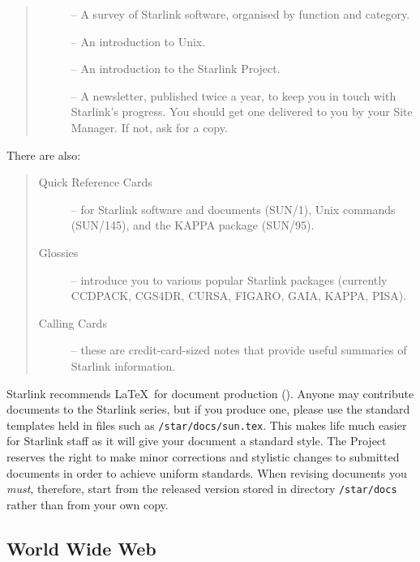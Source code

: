 \newpage

\begin{quote}
\begin{description}
\item []
-- A survey of Starlink software, organised by function and category.
\item []
-- An introduction to Unix.
\item []
-- An introduction to the Starlink Project.
\item [] 
-- A newsletter, published twice a year, to keep you in touch with Starlink's
progress.
You should get one delivered to you by your Site Manager.
If not, ask for a copy.
\end{description}
\end{quote}

There are also:

\begin{quote}
\begin{description}
\item [Quick Reference Cards]
-- for Starlink software and documents (SUN/1),
Unix commands (SUN/145),
and the KAPPA package (SUN/95).
\item [Glossies]
-- introduce you to various popular Starlink packages (currently
CCDPACK, CGS4DR, CURSA, FIGARO, GAIA, KAPPA, PISA).
\item [Calling Cards]
-- these are credit-card-sized notes that provide useful summaries of
Starlink information.
\end{description}
\end{quote}

Starlink recommends \LaTeX\ for document production
().
Anyone may contribute documents to the Starlink series, but if you produce one,
please use the standard templates held in files such as
{\tt /star/docs/sun.tex}.
This makes life much easier for Starlink staff as it will give your document
a standard style.
The Project reserves the right to make minor corrections and stylistic changes
to submitted documents in order to achieve uniform standards.
When revising documents you {\em must}, therefore, start from the released
version stored in directory {\tt /star/docs} rather than from your own copy.

\subsection{World Wide Web}


